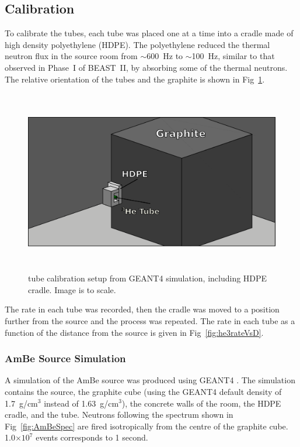 \subsection{Calibration}

To calibrate the \he tubes, each tube was placed one at a time into a cradle made of high density polyethylene (HDPE). The polyethylene reduced the thermal neutron flux in the source room from $\sim$600~Hz to $\sim$100~Hz, similar to that observed in Phase~I of BEAST~II, by absorbing some of the thermal neutrons. The relative orientation of the \he tubes and the graphite is shown in Fig~\ref{fig:he3CalibPosn}. 

\begin{figure}[htb]
	\centerfloat
	\includegraphics[height=8cm]{images/GEANTVis2}
	\caption[\He tube calibration setup]{\He tube calibration setup from GEANT4 simulation, including HDPE cradle. Image is to scale.}	
	\label{fig:he3CalibPosn}
\end{figure}



The rate in each \he tube was recorded, then the cradle was moved to a position further from the source and the process was repeated. The rate in each \he tube as a function of the distance from the source is given in Fig~\ref{fig:he3rateVsD}.



\subsubsection{AmBe Source Simulation}
\label{sec:ambesim}

	A simulation of the AmBe source was produced using GEANT4 \cite{GEANT}. The simulation contains the source, the graphite cube (using the GEANT4 default density of 1.7~g/cm$^3$ instead of 1.63~g/cm$^3$), the concrete walls of the room, the HDPE cradle, and the \he tube. Neutrons following the spectrum shown in Fig~\ref{fig:AmBeSpec} are fired isotropically from the centre of the graphite cube. 1.0$\times10^{7}$ events corresponds to 1 second.


